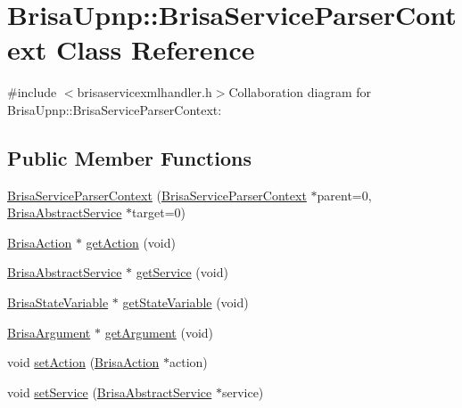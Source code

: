 \hypertarget{classBrisaUpnp_1_1BrisaServiceParserContext}{
\section{BrisaUpnp::BrisaServiceParserContext Class Reference}
\label{classBrisaUpnp_1_1BrisaServiceParserContext}
}


{\ttfamily \#include $<$brisaservicexmlhandler.h$>$}Collaboration diagram for BrisaUpnp::BrisaServiceParserContext:\subsection*{Public Member Functions}
\begin{DoxyCompactItemize}
\item 
\hyperlink{classBrisaUpnp_1_1BrisaServiceParserContext_afb4df40bd858897abdd2c9a79f524486}{BrisaServiceParserContext} (\hyperlink{classBrisaUpnp_1_1BrisaServiceParserContext}{BrisaServiceParserContext} $\ast$parent=0, \hyperlink{classBrisaUpnp_1_1BrisaAbstractService}{BrisaAbstractService} $\ast$target=0)
\item 
\hyperlink{classBrisaUpnp_1_1BrisaAction}{BrisaAction} $\ast$ \hyperlink{classBrisaUpnp_1_1BrisaServiceParserContext_a47ace4eeb3df57509896fb9723363edf}{getAction} (void)
\item 
\hyperlink{classBrisaUpnp_1_1BrisaAbstractService}{BrisaAbstractService} $\ast$ \hyperlink{classBrisaUpnp_1_1BrisaServiceParserContext_a6811e64f743078ec23c7d0b567b97fc7}{getService} (void)
\item 
\hyperlink{classBrisaUpnp_1_1BrisaStateVariable}{BrisaStateVariable} $\ast$ \hyperlink{classBrisaUpnp_1_1BrisaServiceParserContext_a605c6cee63de3e7af556f8062b87b809}{getStateVariable} (void)
\item 
\hyperlink{classBrisaUpnp_1_1BrisaArgument}{BrisaArgument} $\ast$ \hyperlink{classBrisaUpnp_1_1BrisaServiceParserContext_a7f2c5fe31b0689cf6c23a010e6be3fb4}{getArgument} (void)
\item 
void \hyperlink{classBrisaUpnp_1_1BrisaServiceParserContext_adb385461be17908cd774aa09f89ffe14}{setAction} (\hyperlink{classBrisaUpnp_1_1BrisaAction}{BrisaAction} $\ast$action)
\item 
void \hyperlink{classBrisaUpnp_1_1BrisaServiceParserContext_a1927ada7f7ac5b929791e7c6cb9093ee}{setService} (\hyperlink{classBrisaUpnp_1_1BrisaAbstractService}{BrisaAbstractService} $\ast$service)
\item 

\end{DoxyCompactItemize}
